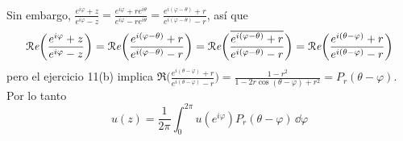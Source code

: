 \begin{sol}
\begin{align*}
\end{align*}
Sin embargo, $\frac{e^{i\varphi} + z}{e^{i\varphi} - z} = \frac{e^{i\varphi} + re^{i\theta}}{e^{i\varphi} - re^{i\theta}} = \frac{e^{i(\varphi-\theta)} + r}{e^{i(\varphi-\theta)} - r}$, así que 
\[
\Re\biggl( \frac{e^{i\varphi} + z}{e^{i\varphi} - z} \biggr) 
= \Re\biggl( \frac{e^{i(\varphi-\theta)} + r}{e^{i(\varphi-\theta)} - r} \biggr) 
= \Re\biggl( \ubar{ \frac{e^{i(\varphi-\theta)} + r}{e^{i(\varphi-\theta)} - r} } \biggr)
= \Re\biggl( \frac{e^{i(\theta - \varphi)} + r}{e^{i(\theta-\varphi)} - r} \biggr) 
\]
pero el ejercicio 11(b) implica $\Re\bigl( \frac{e^{i(\theta - \varphi)} + r}{e^{i(\theta-\varphi)} - r} \bigr) = \frac{1-r^2}{1-2r\cos(\theta-\varphi) + r^2} = P_r(\theta-\varphi)$. Por lo tanto
\[
u(z) =
\frac{1}{2\pi} \int^{2\pi}_0 u(e^{i\varphi}) P_r(\theta-\varphi) \,\dd{\varphi}
\]
\end{sol}